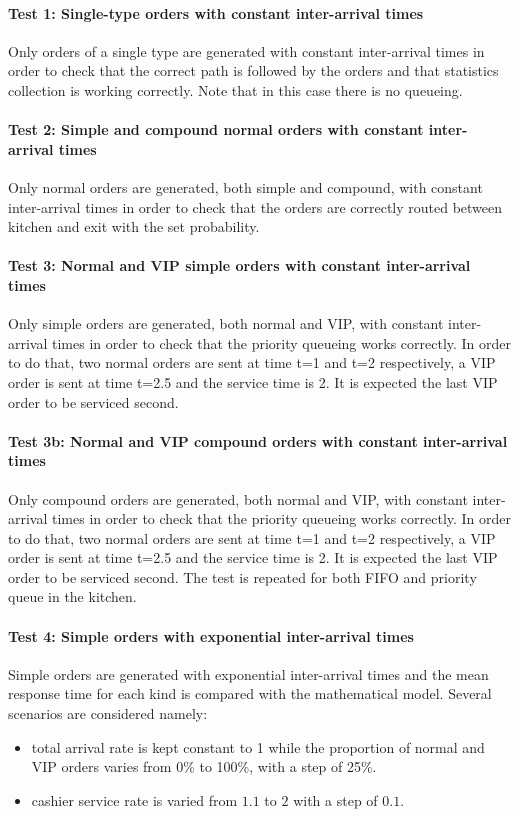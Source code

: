 \paragraph{Test 1: Single-type orders with constant inter-arrival times}
Only orders of a single type are generated with constant inter-arrival times
in order to check that the correct path is followed by the orders and that 
statistics collection is working correctly. 
Note that in this case there is no queueing.

\paragraph{Test 2: Simple and compound normal orders with constant inter-arrival times}
Only normal orders are generated, both simple and compound, with constant inter-arrival times
in order to check that the orders are correctly routed between kitchen and exit with 
the set probability.

\paragraph{Test 3: Normal and VIP simple orders with constant inter-arrival times}
Only simple orders are generated, both normal and VIP, with constant inter-arrival times
in order to check that the priority queueing works correctly. In order to do that, 
two normal orders are sent at time t=1 and t=2 respectively, a VIP order is sent 
at time t=2.5 and the service time is 2. It is expected the last VIP order to be 
serviced second.

\paragraph{Test 3b: Normal and VIP compound orders with constant inter-arrival times}
Only compound orders are generated, both normal and VIP, with constant inter-arrival times
in order to check that the priority queueing works correctly. In order to do that, 
two normal orders are sent at time t=1 and t=2 respectively, a VIP order is sent 
at time t=2.5 and the service time is 2. It is expected the last VIP order to be 
serviced second. The test is repeated for both FIFO and priority queue in the kitchen.

\paragraph{Test 4: Simple orders with exponential inter-arrival times}
Simple orders are generated with exponential inter-arrival times and the 
mean response time for each kind is compared with the mathematical model. Several 
scenarios are considered namely:
\begin{itemize}
    \item total arrival rate is kept constant to 1 while the proportion of 
        normal and VIP orders varies from 0\% to 100\%, with a step of 25\%.
    \item cashier service rate is varied from $1.1$ to $2$ with a step of $0.1$.
\end{itemize}

